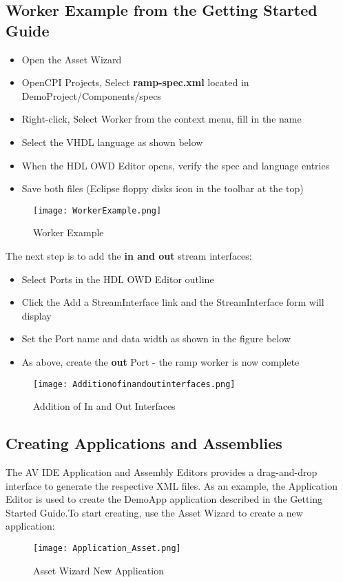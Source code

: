 \subsection{Worker Example from the Getting Started Guide}
\begin{itemize}
\item	Open the Asset Wizard
\item	OpenCPI Projects, Select \textbf{ramp-spec.xml} located in DemoProject/Components/specs
\item	Right-click, Select Worker from the context menu, fill in the name
\item	Select the VHDL language as shown below
\item	When the HDL OWD Editor opens, verify the spec and language entries
\item	Save both files (Eclipse floppy disks icon in the toolbar at the top)
 \end{itemize}
\begin{figure}[h!]
	\centering
	\caption{Worker Example}\label{fig:WorkerExample}
	\texttt{[image: WorkerExample.png]}
 \end{figure}
The next step is to add the \textbf{in and out} stream interfaces:
\begin{itemize}
\item	Select Ports in the HDL OWD Editor outline
\item	Click the Add a StreamInterface link and the StreamInterface form will display
\item	Set the Port name and data width as shown in the figure below
\item	As above, create the \textbf{out} Port - the ramp worker is now complete
 \end{itemize}
\begin{figure}[h!]
	\centering
	\caption{Addition of In and Out Interfaces}\label{fig:AdditionofInandOutInterfaces}
	\texttt{[image: Additionofinandoutinterfaces.png]}
 \end{figure}
\subsection{Creating Applications and Assemblies}
The AV IDE Application and Assembly Editors provides a drag-and-drop interface to generate the respective XML files. As an example, the Application Editor is used to create the DemoApp application described in the Getting Started Guide.To start creating, use the Asset Wizard to create a new application:\\
\begin{figure}[h!]
	\centering
	\caption{Asset Wizard New Application}{}
	\texttt{[image: Application\_Asset.png]}
 \end{figure}

